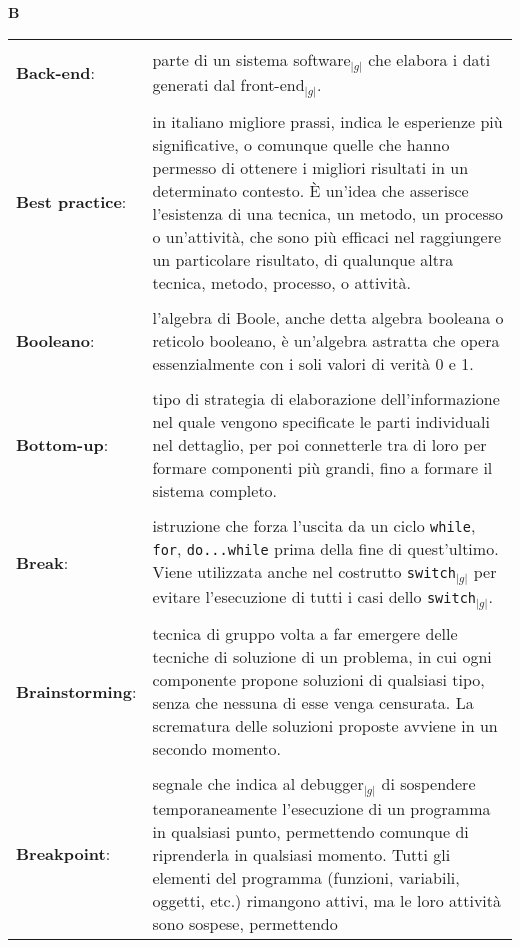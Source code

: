 \hfill\Huge{\textbf{B}}\\
\normalsize
	\begin{longtable}{p{} p{}} 
	    \toprule
	    \\
	    \textbf{Back-end}:		&	parte di un sistema software$_{|g|}$ che elabora i dati generati dal front-end$_{|g|}$.\\
	    \\
	    \textbf{Best practice}:	&	in italiano migliore prassi, indica le esperienze più significative, o comunque quelle che hanno permesso di ottenere i migliori risultati 
						in un determinato contesto. \`E un'idea che asserisce l'esistenza di una tecnica, un metodo, un processo o un'attività, che sono più efficaci
						nel raggiungere un particolare risultato, di qualunque altra tecnica, metodo, processo, o attività. \\
	    \\
	    \textbf{Booleano}:  	&	l'algebra di Boole, anche detta algebra booleana o reticolo booleano, è un'algebra astratta che opera essenzialmente con i soli valori di verità 0 e 1.\\
	    \\
	    \textbf{Bottom-up}:		&	tipo di strategia di elaborazione dell'informazione nel quale vengono specificate le parti individuali nel dettaglio, 
						per poi connetterle tra di loro per formare componenti più grandi, fino a formare il sistema completo.\\
	    \\
	    \textbf{Break}:		&	istruzione che forza l’uscita da un ciclo \texttt{while}, \texttt{for}, \texttt{do...while} prima della fine di quest’ultimo.
						Viene utilizzata anche nel costrutto \texttt{switch}$_{|g|}$ per evitare l’esecuzione di tutti i casi dello \texttt{switch}$_{|g|}$.\\
	    \\
	    \textbf{Brainstorming}:	&	tecnica di gruppo volta a far emergere delle tecniche di soluzione di un problema, in cui ogni componente propone soluzioni di qualsiasi tipo,
						senza che nessuna di esse venga censurata. La scrematura delle soluzioni proposte avviene in un secondo momento.\\
	    \\
	    \textbf{Breakpoint}:	&	segnale che indica al debugger$_{|g|}$ di sospendere temporaneamente l’esecuzione di un programma in qualsiasi punto, permettendo comunque di riprenderla in 
						qualsiasi momento. Tutti gli elementi del programma (funzioni, variabili, oggetti, etc.) rimangono attivi, ma le loro attività sono sospese, permettendo 

\end{longtable}
